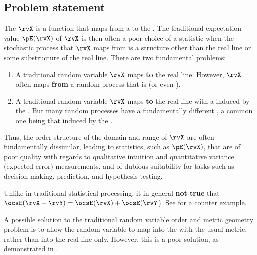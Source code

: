 \subsection{Problem statement}
The  $\rvX$  is a function that maps from a 
 to the  .
The traditional expectation value $\pE(\rvX)$ of $\rvX$ is then often a poor choice of a statistic
when the stochastic process that $\rvX$ maps from is a structure other than the real line or 
some substructure of the real line.
There are two fundamental problems:
\begin{enumerate}
  \item A traditional random variable $\rvX$ maps \textbf{to} 
        the  real line.
        However, $\rvX$ often maps \textbf{from} a random process that is 
        (or even  ).

  \item A traditional random variable $\rvX$ maps \textbf{to} 
        the real line with a   
        induced by the  .
        But many random processes have a fundamentally different ,
        a common one being that induced by the  .
\end{enumerate}
Thus, the order structure of the domain and range of $\rvX$ are often fundamentally dissimilar,
leading to statistics, such as $\pE(\rvX)$, that are
of poor quality with regards to qualitative intuition and quantitative variance (expected error) measurements,
and of dubious suitability for tasks such as decision making, prediction, and hypothesis testing.

\begin{remark}
Unlike in traditional statistical processing,
it in general \textbf{not true} that $\ocsE(\rvX+\rvY)=\ocsE(\rvX)+\ocsE(\rvY$).
See  for a counter example.
\end{remark}

\begin{remark}
A possible solution to the traditional random variable order and metric geometry problem is to allow the 
random variable to map into the   with the usual metric, 
rather than into the real line only. 
However, this is a poor solution, as demonstrated in .
\end{remark}

